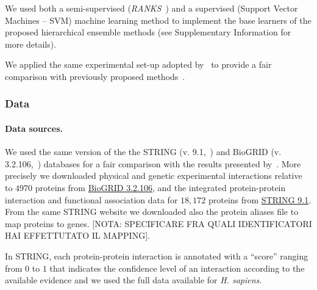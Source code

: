 \documentclass{bioinfo}
\begin{document}
We used both a semi-supervised  ({\em RANKS}~\citet{Vale16a}) and a supervised (Support Vector Machines -- SVM) machine learning method to implement the base learners of the proposed hierarchical ensemble methods (see Supplementary Information for more details).

We applied the same experimental set-up adopted by~\citet{PHENO15} to provide a fair comparison with previously proposed methods~\citep{Schietgat10, Wang13, PHENO15}. 


\subsubsection{Data}
\label{dataset}

\paragraph{Data sources.}
\label{net} 
We used the same version of the the STRING (v. 9.1,~\citet{String91}) and BioGRID (v. 3.2.106,~\citet{biogrid13}) databases for a fair comparison with the results presented by~\citet{PHENO15}. More precisely we downloaded  physical and genetic experimental interactions relative to $4970$ proteins from \href{http://thebiogrid.org/}{BioGRID 3.2.106}, and the integrated  protein-protein interaction and functional association data for $18,172$ proteins from \href{http://string91.embl.de/}{STRING 9.1}. From the same STRING website we downloaded also the protein aliases file to map proteins to genes. 
[NOTA: SPECIFICARE FRA QUALI IDENTIFICATORI HAI EFFETTUTATO IL MAPPING].

In STRING, each protein-protein interaction is annotated with a ``score'' ranging from $0$ to $1$ that indicates the confidence level of an interaction according to the available evidence and we used the full data available for {\em H. sapiens}.
\end{document}
